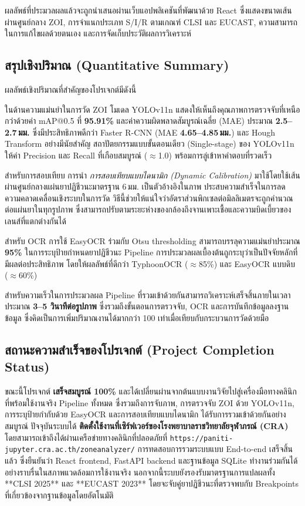 ผลลัพธ์ที่ประมวลผลแล้วจะถูกนำเสนอผ่านเว็บแอปพลิเคชันที่พัฒนาด้วย React ซึ่งแสดงขนาดเส้นผ่านศูนย์กลาง ZOI, การจำแนกประเภท S/I/R ตามเกณฑ์ CLSI และ EUCAST, ความสามารถในการแก้ไขผลด้วยตนเอง และการจัดเก็บประวัติผลการวิเคราะห์

\subsection{สรุปเชิงปริมาณ (Quantitative Summary)}

ผลลัพธ์เชิงปริมาณที่สำคัญของโปรเจกต์มีดังนี้

ในด้านความแม่นยำในการวัด ZOI โมเดล YOLOv11n แสดงให้เห็นถึงคุณภาพการตรวจจับที่เหนือกว่าด้วยค่า mAP@0.5 ที่ \textbf{95.91\%} และค่าความผิดพลาดสัมบูรณ์เฉลี่ย (MAE) ประมาณ \textbf{2.5--2.7\,มม.} ซึ่งมีประสิทธิภาพดีกว่า Faster R-CNN (MAE \textbf{4.65--4.85\,มม.}) และ Hough Transform อย่างมีนัยสำคัญ สถาปัตยกรรมแบบขั้นตอนเดียว (Single-stage) ของ YOLOv11n ให้ค่า Precision และ Recall ที่เกือบสมบูรณ์ ($\approx$1.0) พร้อมการลู่เข้าหาคำตอบที่รวดเร็ว

สำหรับการสอบเทียบ การนำ \emph{การสอบเทียบแบบไดนามิก (Dynamic Calibration)} มาใช้โดยใช้เส้นผ่านศูนย์กลางแผ่นยาปฏิชีวนะมาตรฐาน 6\,มม. เป็นตัวอ้างอิงในภาพ ประสบความสำเร็จในการลดความคลาดเคลื่อนเชิงระบบในการวัด วิธีนี้ช่วยให้แน่ใจว่าอัตราส่วนพิกเซลต่อมิลลิเมตรจะถูกคำนวณต่อแผ่นยาในทุกรูปภาพ ซึ่งสามารถปรับตามระยะห่างของกล้องถึงจานเพาะเชื้อและความบิดเบี้ยวของเลนส์ที่แตกต่างกันได้

สำหรับ OCR การใช้ EasyOCR ร่วมกับ Otsu thresholding สามารถบรรลุความแม่นยำประมาณ \textbf{95\%} ในการระบุป้ายกำหนดยาปฏิชีวนะ Pipeline การประมวลผลเบื้องต้นถูกระบุว่าเป็นปัจจัยหลักที่มีผลต่อประสิทธิภาพ โดยให้ผลลัพธ์ที่ดีกว่า TyphoonOCR ($\approx$85\%) และ EasyOCR แบบดิบ ($\approx$60\%)

สำหรับความเร็วในการประมวลผล Pipeline ที่รวมเข้าด้วยกันสามารถวิเคราะห์เสร็จสิ้นภายในเวลาประมาณ \textbf{3--5 วินาทีต่อรูปภาพ} ซึ่งรวมถึงขั้นตอนการตรวจจับ, OCR และการบันทึกข้อมูลลงฐานข้อมูล ซึ่งคิดเป็นการเพิ่มปริมาณงานได้มากกว่า 100 เท่าเมื่อเทียบกับกระบวนการวัดด้วยมือ

\subsection{สถานะความสำเร็จของโปรเจกต์ (Project Completion Status)}

ขณะนี้โปรเจกต์ \textbf{เสร็จสมบูรณ์ 100\%} และได้เปลี่ยนผ่านจากต้นแบบงานวิจัยไปสู่เครื่องมือทางคลินิกที่พร้อมใช้งานจริง Pipeline ทั้งหมด ซึ่งรวมถึงการจับภาพ, การตรวจจับ ZOI ด้วย YOLOv11n, การระบุป้ายกำกับด้วย EasyOCR และการสอบเทียบแบบไดนามิก ได้รับการรวมเข้าด้วยกันอย่างสมบูรณ์ ปัจจุบันระบบได้ \textbf{ติดตั้งใช้งานที่เซิร์ฟเวอร์ของโรงพยาบาลราชวิทยาลัยจุฬาภรณ์ (CRA)} โดยสามารถเข้าถึงได้ผ่านเครือข่ายทางคลินิกที่ปลอดภัยที่ \texttt{https://paniti-jupyter.cra.ac.th/zoneanalyzer/} การทดสอบการรวมระบบแบบ End-to-end เสร็จสิ้นแล้ว ซึ่งยืนยันว่า React frontend, FastAPI backend และฐานข้อมูล SQLite ทำงานร่วมกันได้อย่างราบรื่นในสภาพแวดล้อมการใช้งานจริง นอกจากนี้ระบบยังรองรับมาตรฐานการแปลผลทั้ง **CLSI 2025** และ **EUCAST 2023** โดยจะจับคู่ยาปฏิชีวนะที่ตรวจพบกับ Breakpoints ที่เกี่ยวข้องจากฐานข้อมูลโดยอัตโนมัติ

